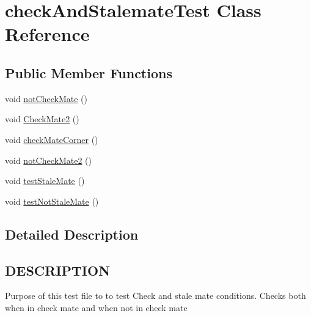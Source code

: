 \hypertarget{classcheckAndStalemateTest}{\section{check\-And\-Stalemate\-Test Class Reference}
\label{classcheckAndStalemateTest}
}
\subsection*{Public Member Functions}
\begin{DoxyCompactItemize}
\item 
void \hyperlink{classcheckAndStalemateTest_a5668f045112354c1f68d21672392fe6f}{not\-Check\-Mate} ()
\item 
void \hyperlink{classcheckAndStalemateTest_aa1921599cca9f683a7ec85b55b9e89d4}{Check\-Mate2} ()
\item 
void \hyperlink{classcheckAndStalemateTest_ae25383d95c6447b95c496393399a0c63}{check\-Mate\-Corner} ()
\item 
void \hyperlink{classcheckAndStalemateTest_a702353db483f5ae6465650b83bc483f5}{not\-Check\-Mate2} ()
\item 
void \hyperlink{classcheckAndStalemateTest_abeed66bda654ac5801e03c4a8cef2771}{test\-Stale\-Mate} ()
\item 
void \hyperlink{classcheckAndStalemateTest_ae098f07b4409b04df0d693aa12ce7761}{test\-Not\-Stale\-Mate} ()
\end{DoxyCompactItemize}


\subsection{Detailed Description}
\hypertarget{classvalidMoveTest_DESCRIPTION}{}\subsection{D\-E\-S\-C\-R\-I\-P\-T\-I\-O\-N}\label{classvalidMoveTest_DESCRIPTION}
Purpose of this test file to to test Check and stale mate conditions. Checks both when in check mate and when not in check mate 

